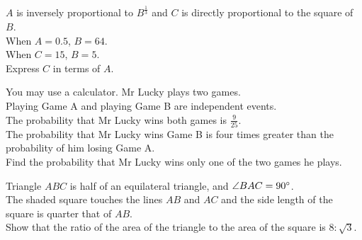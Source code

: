 \documentclass{exam}
\begin{document}
\begin{questions}
\begin{minipage}{0.4\textwidth}
    \end{minipage}
    \newpage

    \question $A$ is inversely proportional to $B^\frac{1}{3}$ and $C$ is directly proportional to the square of $B$.\\
    When $A=0.5$, $B=64$.\\
    When $C=15$, $B=5$.\\
    Express $C$ in terms of $A$.
    \newpage

    \question You may use a calculator. Mr Lucky plays two games.\\
    Playing Game A and playing Game B are independent events.\\
    The probability that Mr Lucky wins both games is $\frac{9}{25}$.\\
    The probability that Mr Lucky wins Game B is four times greater than the probability of him losing Game A.\\
    Find the probability that Mr Lucky wins only one of the two games he plays.
    \newpage

    \question \phantom{1pt}
    \begin{center}
    \end{center}
    Triangle $ABC$ is half of an equilateral triangle, and $\angle BAC = 90\degree$.\\
    The shaded square touches the lines $AB$ and $AC$ and the side length of the square is quarter that of $AB$.\\
    Show that the ratio of the area of the triangle to the area of the square is $8:\sqrt{3}$.
    \newpage


\end{questions}
\end{document}
